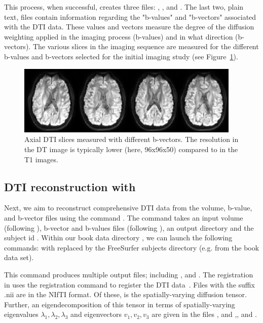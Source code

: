 This process, when successful, creates three files: ,
, and .  The last two, plain
text, files contain information regarding the "b-values" and
"b-vectors" associated with the DTI data. These values and vectors
measure the degree of the diffusion weighting applied in the imaging
process (b-values) and in what direction (b-vectors). The various
slices in the imaging sequence are measured for the different b-values
and b-vectors selected for the initial imaging study (see
Figure~\ref{fig:chp5:DTIslices}).
\begin{figure}	
\begin{center}
  \includegraphics[width=0.95\textwidth]{./chapters/chp5/FIG/dwi.png}
\end{center}
\caption{Axial DTI slices measured with different b-vectors. The
  resolution in the DT image is typically lower (here, 96x96x50)
  compared to in the T1 images.}
\label{fig:chp5:DTIslices}
\end{figure}

\subsection{DTI reconstruction with \freesurfer}
\label{sec:chp-dti:freesurfer-dtrecon}

Next, we aim to reconstruct comprehensive DTI data from the volume,
b-value, and b-vector files using the \freesurfer{} command
. The command takes an input volume (following
), b-vector and b-values files (following ), an
output directory  and the  subject id
. Within our book data directory , we
can launch the following commands:
\noindent with  replaced by the FreeSurfer subjects
directory (e.g.  from the book data set).

This command produces multiple output files; including
,  and . The
registration in  uses the registration command
 to register the DTI
data~\cite{freesurfer-wiki}. Files with the suffix .nii are in the
NIfTI format. Of these,  is the spatially-varying
diffusion tensor. Further, an eigendecomposition of this tensor in
terms of spatially-varying eigenvalues $\lambda_1, \lambda_2,
\lambda_3$ and eigenvectors $v_1, v_2, v_3$ are given in the files
, and ,,
and .


